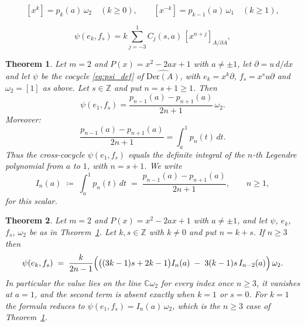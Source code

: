 \documentclass[10pt,a4paper]{amsart}
\newtheorem{theorem}{Theorem}
\newcommand{\C}{\mathbb{C}}
\newcommand{\Der}{\mathrm{Der}}
\newcommand{\Z}{\mathbb{Z}}
\newcommand{\hDer}{\widehat{\Der(A)}}
\newcommand{\pa}{\partial}
\begin{document}
\begin{equation}\label{eq:legendre_red}
  [x^k] = p_k(a)\,\omega_2 \quad (k\geq 0),\qquad
  [x^{-k}] = p_{k-1}(a)\,\omega_1 \quad (k\geq 1),
\end{equation}

\begin{equation}\label{eq:cross_general}
  \psi(e_k,f_s) = k\!\sum_{j=-3}^{1} C_j(s,a)\,[x^{n+j}]_{A/\pa A},
\end{equation}

\begin{theorem}\label{thm:antiderivative}
Let $m=2$ and $P(x)=x^2-2ax+1$ with $a\neq\pm1$, let $\pa=u\,d/dx$ and let
$\psi$ be the cocycle \eqref{eq:psi_def} of $\hDer$, with $e_k=x^k\pa$,
$f_s=x^su\pa$ and $\omega_2=[1]$ as above. Let $s\in\Z$ and put
$n=s+1\geq1$. Then
\begin{equation}\label{eq:antideriv}
  \psi(e_1,f_s) = \frac{p_{n-1}(a)-p_{n+1}(a)}{2n+1}\,\omega_2.
\end{equation}
Moreover:
\begin{equation}\label{eq:antideriv_integral}
  \frac{p_{n-1}(a)-p_{n+1}(a)}{2n+1} = \int_a^1 p_n(t)\,dt.
\end{equation}
Thus the cross-cocycle $\psi(e_1,f_s)$ equals the definite integral
of the $n$-th Legendre polynomial from $a$ to $1$, with
$n=s+1$. We write
\begin{equation}\label{eq:In}
  I_n(a)\;\coloneqq\;\int_a^1p_n(t)\,dt\;=\;\frac{p_{n-1}(a)-p_{n+1}(a)}{2n+1},
  \qquad n\geq1 ,
\end{equation}
for this scalar.
\end{theorem}

\begin{theorem}\label{thm:cross_closed}
Let $m=2$ and $P(x)=x^2-2ax+1$ with $a\neq\pm1$, and let $\psi$, $e_k$, $f_s$,
$\omega_2$ be as in Theorem~\ref{thm:antiderivative}. Let $k,s\in\Z$ with
$k\neq0$ and put $n=k+s$. If $n\geq3$ then
\begin{equation}\label{eq:cross_closed}
  \psi(e_k,f_s)
  \;=\;
  \frac{k}{2n-1}\Bigl(\bigl((3k-1)s+2k-1\bigr)I_n(a)
      \;-\;3(k-1)s\,I_{n-2}(a)\Bigr)\,\omega_2 .
\end{equation}
In particular the value lies on the line $\C\omega_2$ for every index once
$n\geq3$, it vanishes at $a=1$, and the second term is absent exactly when
$k=1$ or $s=0$. For $k=1$ the formula reduces to
$\psi(e_1,f_s)=I_n(a)\,\omega_2$, which is the $n\geq3$ case of
Theorem~\ref{thm:antiderivative}.
\end{theorem}
\end{document}
